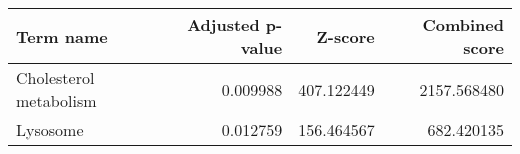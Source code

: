 \begin{tabular}{lrrr}
\toprule
             Term name &  Adjusted p-value &    Z-score &  Combined score \\
\midrule
Cholesterol metabolism &          0.009988 & 407.122449 &     2157.568480 \\
              Lysosome &          0.012759 & 156.464567 &      682.420135 \\
\bottomrule
\end{tabular}
